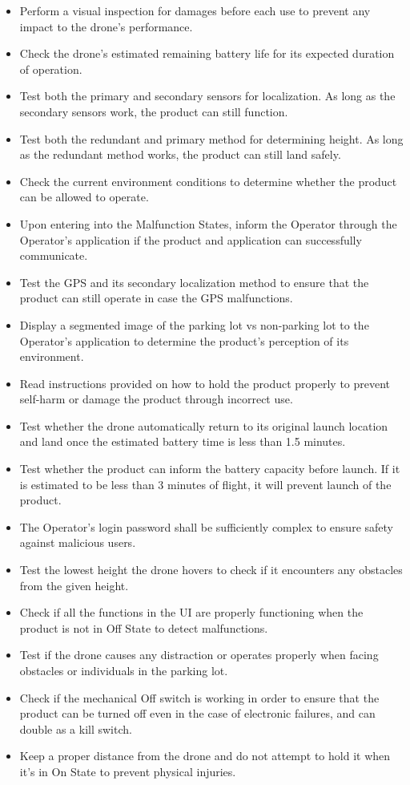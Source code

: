 \documentclass[12pt]{article}
\begin{document}
\begin{itemize}
    \item Perform a visual inspection for damages before each use to prevent any impact to the drone's performance.
    \item Check the drone's estimated remaining battery life for its expected duration of operation.
    \item Test both the primary and secondary sensors for localization. As long as the secondary sensors work, the product can still function.
    \item Test both the redundant and primary method for determining height. As long as the redundant method works, the product can still land safely.
    \item Check the current environment conditions to determine whether the product can be allowed to operate.
    \item Upon entering into the Malfunction States, inform the Operator through the Operator’s application if the product and application can successfully communicate.
    \item Test the GPS and its secondary localization method to ensure that the product can still operate in case the GPS malfunctions.
    \item Display a segmented image of the parking lot vs non-parking lot to the Operator’s application to determine the product’s perception of its environment.
    \item Read instructions provided on how to hold the product properly to prevent self-harm or damage the product through incorrect use.
    \item Test whether the drone automatically return to its original launch location and land once the estimated battery time is less than 1.5 minutes.
    \item Test whether the product can inform the battery capacity before launch. If it is estimated to be less than 3 minutes of flight, it will prevent launch of the product.
    \item The Operator’s login password shall be sufficiently complex to ensure safety against malicious users.
    \item Test the lowest height the drone hovers to check if it encounters any obstacles from the given height.
    \item Check if all the functions in the UI are properly functioning when the product is not in Off State to detect malfunctions.
    \item Test if the drone causes any distraction or operates properly when facing obstacles or individuals in the parking lot.
    \item Check if the mechanical Off switch is working in order to ensure that the product can be turned off even in the case of electronic failures, and can double as a kill switch.
    \item Keep a proper distance from the drone and do not attempt to hold it when it's in On State to prevent physical injuries.
\end{itemize}
\end{document}
